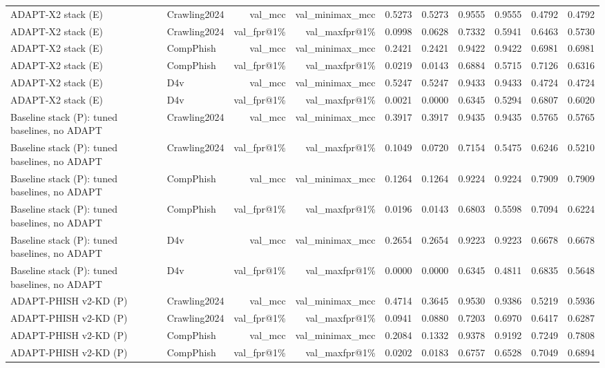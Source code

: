 \begin{table}[t]
\begin{tabular}{llrrrrrrrr}
ADAPT-X2 stack (E) & Crawling2024 & val\_mcc & val\_minimax\_mcc & 0.5273 & 0.5273 & 0.9555 & 0.9555 & 0.4792 & 0.4792 \\
ADAPT-X2 stack (E) & Crawling2024 & val\_fpr@1\% & val\_maxfpr@1\% & 0.0998 & 0.0628 & 0.7332 & 0.5941 & 0.6463 & 0.5730 \\
ADAPT-X2 stack (E) & CompPhish & val\_mcc & val\_minimax\_mcc & 0.2421 & 0.2421 & 0.9422 & 0.9422 & 0.6981 & 0.6981 \\
ADAPT-X2 stack (E) & CompPhish & val\_fpr@1\% & val\_maxfpr@1\% & 0.0219 & 0.0143 & 0.6884 & 0.5715 & 0.7126 & 0.6316 \\
ADAPT-X2 stack (E) & D4v & val\_mcc & val\_minimax\_mcc & 0.5247 & 0.5247 & 0.9433 & 0.9433 & 0.4724 & 0.4724 \\
ADAPT-X2 stack (E) & D4v & val\_fpr@1\% & val\_maxfpr@1\% & 0.0021 & 0.0000 & 0.6345 & 0.5294 & 0.6807 & 0.6020 \\
Baseline stack (P): tuned baselines, no ADAPT & Crawling2024 & val\_mcc & val\_minimax\_mcc & 0.3917 & 0.3917 & 0.9435 & 0.9435 & 0.5765 & 0.5765 \\
Baseline stack (P): tuned baselines, no ADAPT & Crawling2024 & val\_fpr@1\% & val\_maxfpr@1\% & 0.1049 & 0.0720 & 0.7154 & 0.5475 & 0.6246 & 0.5210 \\
Baseline stack (P): tuned baselines, no ADAPT & CompPhish & val\_mcc & val\_minimax\_mcc & 0.1264 & 0.1264 & 0.9224 & 0.9224 & 0.7909 & 0.7909 \\
Baseline stack (P): tuned baselines, no ADAPT & CompPhish & val\_fpr@1\% & val\_maxfpr@1\% & 0.0196 & 0.0143 & 0.6803 & 0.5598 & 0.7094 & 0.6224 \\
Baseline stack (P): tuned baselines, no ADAPT & D4v & val\_mcc & val\_minimax\_mcc & 0.2654 & 0.2654 & 0.9223 & 0.9223 & 0.6678 & 0.6678 \\
Baseline stack (P): tuned baselines, no ADAPT & D4v & val\_fpr@1\% & val\_maxfpr@1\% & 0.0000 & 0.0000 & 0.6345 & 0.4811 & 0.6835 & 0.5648 \\
ADAPT-PHISH v2-KD (P) & Crawling2024 & val\_mcc & val\_minimax\_mcc & 0.4714 & 0.3645 & 0.9530 & 0.9386 & 0.5219 & 0.5936 \\
ADAPT-PHISH v2-KD (P) & Crawling2024 & val\_fpr@1\% & val\_maxfpr@1\% & 0.0941 & 0.0880 & 0.7203 & 0.6970 & 0.6417 & 0.6287 \\
ADAPT-PHISH v2-KD (P) & CompPhish & val\_mcc & val\_minimax\_mcc & 0.2084 & 0.1332 & 0.9378 & 0.9192 & 0.7249 & 0.7808 \\
ADAPT-PHISH v2-KD (P) & CompPhish & val\_fpr@1\% & val\_maxfpr@1\% & 0.0202 & 0.0183 & 0.6757 & 0.6528 & 0.7049 & 0.6894 \\

\end{tabular}
\end{table}
